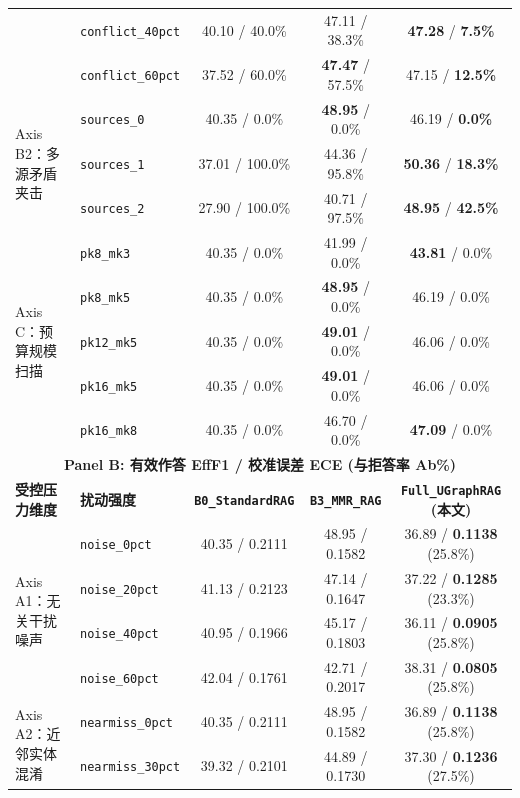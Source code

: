 \documentclass[11pt]{article}
\begin{document}
\begin{table}[t]
{{\begin{tabular}{llccc}
& \texttt{conflict\_40pct} & 40.10 / 40.0\% & 47.11 / 38.3\% & \textbf{47.28} / \textbf{7.5\%} \\
& \texttt{conflict\_60pct} & 37.52 / 60.0\% & \textbf{47.47} / 57.5\% & 47.15 / \textbf{12.5\%} \\
\midrule
\multirow{3}{*}{Axis B2：多源矛盾夹击}
& \texttt{sources\_0} & 40.35 / 0.0\% & \textbf{48.95} / 0.0\% & 46.19 / \textbf{0.0\%} \\
& \texttt{sources\_1} & 37.01 / 100.0\% & 44.36 / 95.8\% & \textbf{50.36} / \textbf{18.3\%} \\
& \texttt{sources\_2} & 27.90 / 100.0\% & 40.71 / 97.5\% & \textbf{48.95} / \textbf{42.5\%} \\
\midrule
\multirow{5}{*}{Axis C：预算规模扫描}
& \texttt{pk8\_mk3} & 40.35 / 0.0\% & 41.99 / 0.0\% & \textbf{43.81} / 0.0\% \\
& \texttt{pk8\_mk5} & 40.35 / 0.0\% & \textbf{48.95} / 0.0\% & 46.19 / 0.0\% \\
& \texttt{pk12\_mk5} & 40.35 / 0.0\% & \textbf{49.01} / 0.0\% & 46.06 / 0.0\% \\
& \texttt{pk16\_mk5} & 40.35 / 0.0\% & \textbf{49.01} / 0.0\% & 46.06 / 0.0\% \\
& \texttt{pk16\_mk8} & 40.35 / 0.0\% & 46.70 / 0.0\% & \textbf{47.09} / 0.0\% \\
\midrule
\midrule
\multicolumn{5}{c}{\textbf{Panel B: 有效作答 EffF1 / 校准误差 ECE (与拒答率 Ab\%)}} \\
\midrule
\textbf{受控压力维度} & \textbf{扰动强度} & \textbf{\texttt{B0\_StandardRAG}} & \textbf{\texttt{B3\_MMR\_RAG}} & \textbf{\texttt{Full\_UGraphRAG} (本文)} \\
\midrule
\multirow{4}{*}{Axis A1：无关干扰噪声}
& \texttt{noise\_0pct} & 40.35 / 0.2111 & 48.95 / 0.1582 & 36.89 / \textbf{0.1138} (25.8\%) \\
& \texttt{noise\_20pct} & 41.13 / 0.2123 & 47.14 / 0.1647 & 37.22 / \textbf{0.1285} (23.3\%) \\
& \texttt{noise\_40pct} & 40.95 / 0.1966 & 45.17 / 0.1803 & 36.11 / \textbf{0.0905} (25.8\%) \\
& \texttt{noise\_60pct} & 42.04 / 0.1761 & 42.71 / 0.2017 & 38.31 / \textbf{0.0805} (25.8\%) \\
\midrule
\multirow{3}{*}{Axis A2：近邻实体混淆}
& \texttt{nearmiss\_0pct} & 40.35 / 0.2111 & 48.95 / 0.1582 & 36.89 / \textbf{0.1138} (25.8\%) \\
& \texttt{nearmiss\_30pct} & 39.32 / 0.2101 & 44.89 / 0.1730 & 37.30 / \textbf{0.1236} (27.5\%) \\

\end{tabular}}}
\end{table}
\end{document}
